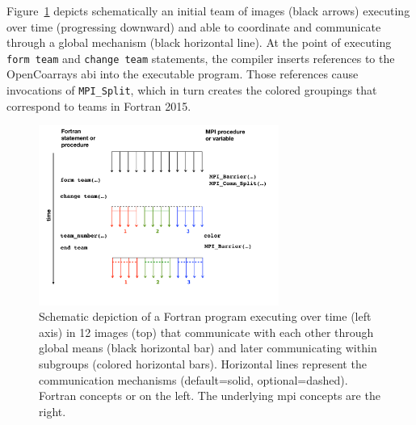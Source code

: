 Figure~\ref{fig:teams} depicts schematically an initial team of images (black arrows) executing over time (progressing
downward) and able to coordinate and communicate through a global mechanism (black horizontal line).  At the point of executing
\texttt{form team} and \texttt{change team} statements, the compiler inserts references to the OpenCoarrays \gls{abi} into the
executable program.  Those references cause invocations of \texttt{MPI\_Split}, which in turn creates the colored groupings that
correspond to teams in Fortran 2015.

\begin{figure}
\includegraphics[width=0.7\textwidth]{figures/teams}
\vspace{-36pt}
\caption{Schematic depiction of a Fortran program executing over time
  (left axis) in 12 images (top) that communicate with each other through global means (black horizontal bar) and later communicating within subgroups (colored horizontal bars).  Horizontal lines represent the communication mechanisms (default=solid, optional=dashed).  Fortran concepts or on the left.  The underlying \gls{mpi} concepts are the right.\label{fig:teams}}
\end{figure}
%

